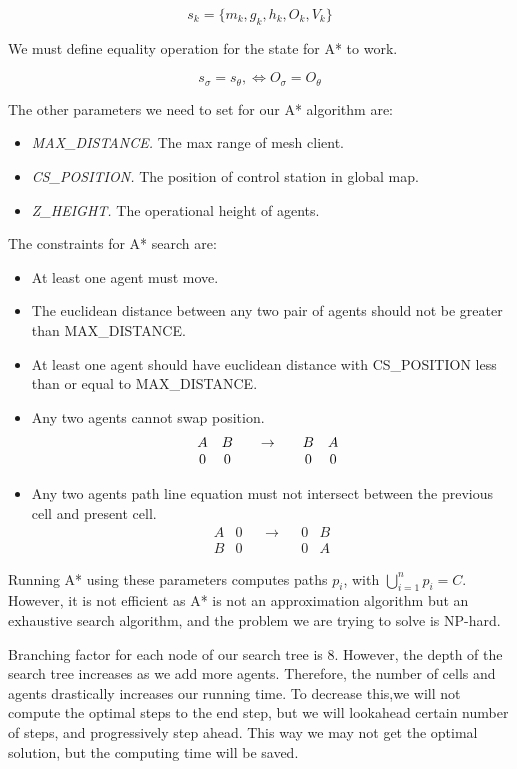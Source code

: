 $$ s_k = \{m_k, g_k, h_k, O_k, V_k\} $$

We must define equality operation for the state for A* to work.

$$ s_\sigma = s_\theta, \iff O_\sigma = O_\theta $$


The other parameters we need to set for our A* algorithm are:
\begin{itemize}
	\item \textit{MAX\_DISTANCE.} The max range of mesh client. 
	\item \textit{CS\_POSITION.} The position of control station in global map.
	\item \textit{Z\_HEIGHT.} The operational height of agents.
\end{itemize}


The constraints for A* search are:
\begin{itemize}
	\item At least one agent must move.
	\item The euclidean distance between any two pair of agents should not be greater than MAX\_DISTANCE.
	\item At least one agent should have euclidean distance with CS\_POSITION less than or equal to MAX\_DISTANCE.
	\item Any two agents cannot swap position. $$\begin{matrix} \label{eq:swap_agent}
	A & B && \to && B & A\\
	0 & 0 && && 0 & 0
	\end{matrix} \\
	$$
	
	\item Any two agents path line equation must not intersect between the previous cell and present cell. $$
	\begin{matrix} \label{eq:intersect_agent}
	A & 0 && \to && 0 & B\\
	B & 0 &&&& 0 & A
	\end{matrix}
	$$
\end{itemize}

Running A* using these parameters computes paths $p_i$, with $\bigcup\limits_{i=1}^{n} p_i = C$. However, it is not efficient as A* is not an approximation algorithm but an exhaustive search algorithm, and the problem we are trying to solve is NP-hard.


Branching factor for each node of our search tree is 8. However, the depth of the search tree increases as we add more agents. Therefore, the number of cells and agents drastically increases our running time. To decrease this,we will not compute the optimal steps to the end step, but we will lookahead certain number of steps, and progressively step ahead. This way we may not get the optimal solution, but the computing time will be saved. 

